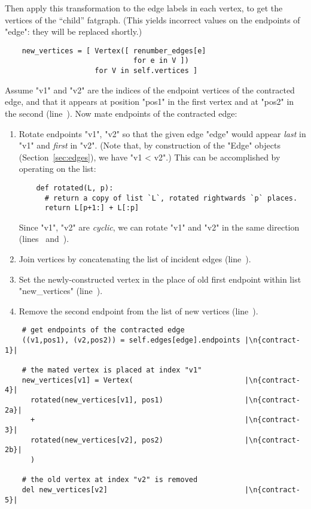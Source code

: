 Then apply this transformation to the edge labels in each vertex, to
get the vertices of the ``child'' fatgraph. (This yields incorrect
values on the endpoints of "edge": they will be replaced shortly.)
\begin{lstlisting}
    new_vertices = [ Vertex([ renumber_edges[e] 
                              for e in V ])
                     for V in self.vertices ]

\end{lstlisting}

Assume "v1" and "v2" are the indices of the endpoint vertices of the
contracted edge, and that it appears at position "pos1" in the first
vertex and at "pos2" in the second (line~).  Now mate
endpoints of the contracted edge:
\begin{enumerate}
\item Rotate endpoints "v1", "v2" so that the given edge "edge" would
  appear \emph{last} in "v1" and \emph{first} in "v2". (Note that, by
  construction of the "Edge" objects (Section~\ref{sec:edges}), we have 
  "v1 < v2".) This can be accomplished by operating on the list:
\begin{lstlisting}
    def rotated(L, p):
      # return a copy of list `L`, rotated rightwards `p` places.
      return L[p+1:] + L[:p]
\end{lstlisting}
  Since "v1", "v2" are \emph{cyclic}, we can rotate "v1" and "v2" in
  the same direction (lines~ and~).
\item Join vertices by concatenating the list of incident
  edges (line~).
\item Set the newly-constructed vertex in the place of old first
  endpoint within list "new_vertices" (line~).
\item Remove the second endpoint from the list of new vertices
  (line~).
\end{enumerate}
\begin{lstlisting}
    # get endpoints of the contracted edge
    ((v1,pos1), (v2,pos2)) = self.edges[edge].endpoints |\n{contract-1}|

    # the mated vertex is placed at index "v1"
    new_vertices[v1] = Vertex(                          |\n{contract-4}|
      rotated(new_vertices[v1], pos1)                   |\n{contract-2a}|
      +                                                 |\n{contract-3}|
      rotated(new_vertices[v2], pos2)                   |\n{contract-2b}|
      )

    # the old vertex at index "v2" is removed
    del new_vertices[v2]                                |\n{contract-5}|

\end{lstlisting}

